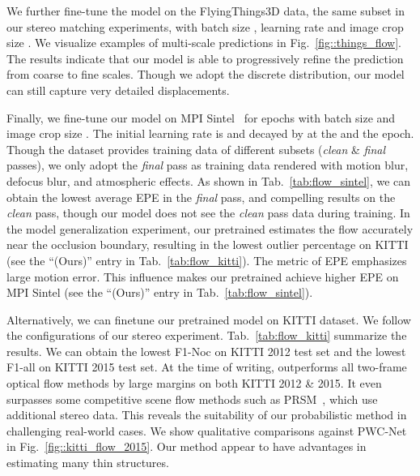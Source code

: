 We further fine-tune the model on the FlyingThings3D data, the same subset in our stereo matching experiments, with batch size , learning rate  and image crop size .
We visualize examples of multi-scale predictions in Fig.~\ref{fig::things_flow}. The results indicate that our model is able to progressively refine the prediction from coarse to fine scales. Though we adopt the discrete distribution, our model can still capture very detailed displacements.

 Finally, we fine-tune our model on MPI Sintel~\cite{sintel} for  epochs with batch size  and image crop size . 
The initial learning rate is  and decayed by  at the  and the  epoch.  
Though the dataset provides training data of different subsets (\emph{clean} \& \emph{final} passes), we only adopt the \emph{final} pass as training data rendered with motion blur, defocus blur, and atmospheric effects. As shown in Tab.~\ref{tab:flow_sintel}, we can obtain the lowest average EPE in the \emph{final} pass, and compelling results on the \emph{clean} pass, though our model does not see the \emph{clean} pass data during training.
In the model generalization experiment, 
our pretrained \flowmodelname estimates the flow accurately near the occlusion boundary, resulting in the lowest outlier percentage on KITTI (see the ``\flowmodelname (Ours)'' entry in Tab.~\ref{tab:flow_kitti}). 
The metric of EPE emphasizes large motion error. This influence makes our pretrained \flowmodelname achieve higher EPE on MPI Sintel (see the ``\flowmodelname (Ours)'' entry in Tab.~\ref{tab:flow_sintel}). 

Alternatively, we can finetune our pretrained model on KITTI dataset. 
We follow the configurations of our stereo experiment. Tab.~\ref{tab:flow_kitti} summarize the results. 
We can obtain the lowest F1-Noc on KITTI 2012 test set and the lowest F1-all on KITTI 2015 test set. 
At the time of writing, \flowmodelname outperforms all two-frame optical flow methods by large margins on both KITTI 2012 \& 2015. 
It even surpasses some competitive scene flow methods such as PRSM~\cite{prsm}, which use additional stereo data. 
This reveals the suitability of our probabilistic method in challenging real-world cases. We show qualitative comparisons against PWC-Net in Fig.~\ref{fig::kitti_flow_2015}. Our method appear to have advantages in estimating many thin structures.

